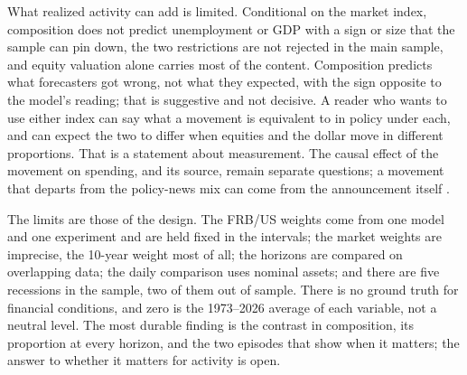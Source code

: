 \documentclass[11pt]{article}
\begin{document}
What realized activity can add is limited. Conditional on the market index, composition does not predict unemployment or GDP with a sign or size that the sample can pin down, the two restrictions are not rejected in the main sample, and equity valuation alone carries most of the content. Composition predicts what forecasters got wrong, not what they expected, with the sign opposite to the model's reading; that is suggestive and not decisive. A reader who wants to use either index can say what a movement is equivalent to in policy under each, and can expect the two to differ when equities and the dollar move in different proportions. That is a statement about measurement. The causal effect of the movement on spending, and its source, remain separate questions; a movement that departs from the policy-news mix can come from the announcement itself \citep{boehm2025}.

The limits are those of the design. The FRB/US weights come from one model and one experiment and are held fixed in the intervals; the market weights are imprecise, the 10-year weight most of all; the horizons are compared on overlapping data; the daily comparison uses nominal assets; and there are five recessions in the sample, two of them out of sample. There is no ground truth for financial conditions, and zero is the 1973--2026 average of each variable, not a neutral level. The most durable finding is the contrast in composition, its proportion at every horizon, and the two episodes that show when it matters; the answer to whether it matters for activity is open.
\FloatBarrier


\end{document}
